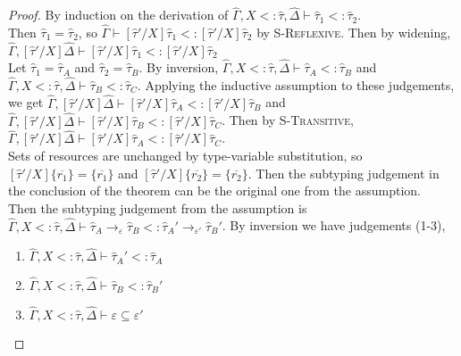 \documentclass{llncs}
\begin{document}
\begin{proof} By induction on the derivation of $\hat \Gamma, X <: \hat \tau, \hat \Delta \vdash \hat \tau_1 <: \hat \tau_2$.\\

 Then $\hat \tau_1 = \hat \tau_2$, so $\hat \Gamma \vdash [\hat \tau'/X]\hat \tau_1 <: [\hat \tau'/X]\hat \tau_2$ by \textsc{S-Reflexive}. Then by widening, $\hat \Gamma, [\hat \tau'/X]\hat \Delta \vdash [\hat \tau'/X]\hat \tau_1 <: [\hat \tau'/X]\hat \tau_2$ \\

 Let $\hat \tau_1 = \hat \tau_A$ and $\hat \tau_2 = \hat \tau_B$. By inversion, $\hat \Gamma, X <: \hat \tau, \hat \Delta \vdash \hat \tau_A <: \hat \tau_B$ and $\hat \Gamma, X <: \hat \tau, \hat \Delta \vdash \hat \tau_B <: \hat \tau_C$. Applying the inductive assumption to these judgements, we get $\hat \Gamma, [\hat \tau'/X]\hat \Delta \vdash [\hat \tau'/X]\hat \tau_A <: [\hat \tau'/X]\hat \tau_B$ and $\hat \Gamma, [\hat \tau'/X]\hat \Delta \vdash [\hat \tau'/X]\hat \tau_B <: [\hat \tau'/X]\hat \tau_C$. Then by \textsc{S-Transitive}, $\hat \Gamma, [\hat \tau'/X]\hat \Delta \vdash [\hat \tau'/X]\hat \tau_A <: [\hat \tau'/X]\hat \tau_C$.\\

 Sets of resources are unchanged by type-variable substitution, so $[\hat \tau'/X]\{ \overline{r_1} \} = \{ \overline{r_1} \}$ and $[\hat \tau'/X]\{ \overline{r_2} \} = \{ \overline{r_2} \}$. Then the subtyping judgement in the conclusion of the theorem can be the original one from the assumption. \\

 Then the subtyping judgement from the assumption is $\hat \Gamma, X <: \hat \tau, \hat \Delta \vdash \hat \tau_A \rightarrow_{\varepsilon} \hat \tau_B <: \hat \tau_A' \rightarrow_{\varepsilon'} \hat \tau_B'$. By inversion we have judgements (1-3),

\begin{enumerate}
	\item $\hat \Gamma, X <: \hat \tau, \hat \Delta \vdash \hat \tau_A' <: \hat \tau_A$
	\item $\hat \Gamma, X <: \hat \tau, \hat \Delta \vdash \hat \tau_B <: \hat \tau_B'$
	\item $\hat \Gamma, X <: \hat \tau, \hat \Delta \vdash \varepsilon \subseteq \varepsilon'$
\end{enumerate}


\end{proof}
\end{document}
